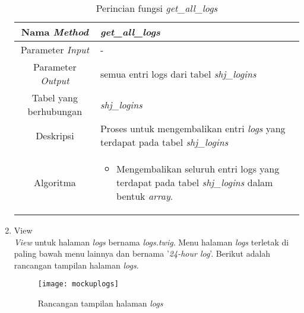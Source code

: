 \begin{enumerate}
	\begin{table}[H]
		\caption{Perincian fungsi \textit{get\_all\_logs}}
		\begin{tabular}{|c|p{11cm}|}
			\hline
			Nama \textit{Method} 	& 	\textit{get\_all\_logs} 	\\
			\hline
			Parameter \textit{Input} & - \\
			\hline
			Parameter \textit{Output} &  semua entri logs dari tabel \textit{shj\_logins}\\
			\hline
			Tabel yang berhubungan & \textit{shj\_logins} \\
			\hline
			Deskripsi	& Proses untuk mengembalikan entri \textit{logs} yang terdapat pada tabel \textit{shj\_logins} \\
			\hline
			Algoritma	& \begin{itemize}
				\item Mengembalikan seluruh entri logs yang terdapat pada tabel \textit{shj\_logins} dalam bentuk \textit{array}.
			\end{itemize} \\
			\hline
		\end{tabular}
	\end{table}

	\item View \\
	\textit{View} untuk halaman \textit{logs} bernama \textit{logs.twig}. Menu halaman \textit{logs} terletak di paling bawah menu lainnya dan bernama '\textit{24-hour log}'. Berikut adalah rancangan tampilan halaman \textit{logs}.
	
	\begin{figure}[H]
		\centering  
		\texttt{[image: mockuplogs]}  
		\caption[Rancangan tampilan halaman \textit{logs}]{Rancangan tampilan halaman \textit{logs}} 
		\label{fig:mockuplogs} 
	\end{figure}


\end{enumerate}
